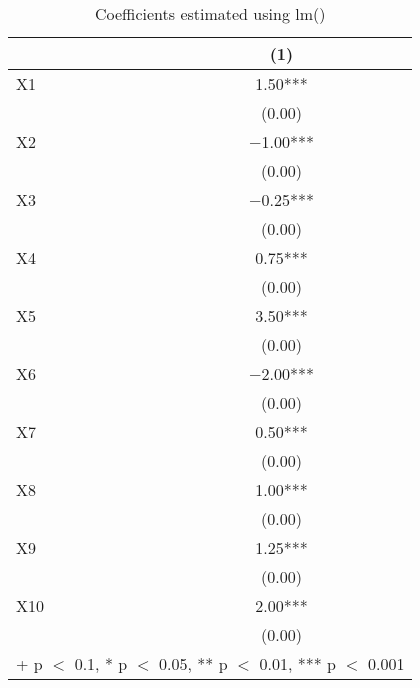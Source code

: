 \documentclass{article}
\begin{document}
\begin{table}
\centering
\caption{Coefficients estimated using lm()}
\begin{tabular}[t]{lc}
\toprule
  & (1)\\
\midrule
X1 & \num{1.50}***\\
 & (\num{0.00})\\
X2 & \num{-1.00}***\\
 & (\num{0.00})\\
X3 & \num{-0.25}***\\
 & (\num{0.00})\\
X4 & \num{0.75}***\\
 & (\num{0.00})\\
X5 & \num{3.50}***\\
 & (\num{0.00})\\
X6 & \num{-2.00}***\\
 & (\num{0.00})\\
X7 & \num{0.50}***\\
 & (\num{0.00})\\
X8 & \num{1.00}***\\
 & (\num{0.00})\\
X9 & \num{1.25}***\\
 & (\num{0.00})\\
X10 & \num{2.00}***\\
 & (\num{0.00})\\
\bottomrule
\multicolumn{2}{l}{\rule{0pt}{1em}+ p $<$ 0.1, * p $<$ 0.05, ** p $<$ 0.01, *** p $<$ 0.001}\\
\end{tabular}
\end{table}
\end{document}
